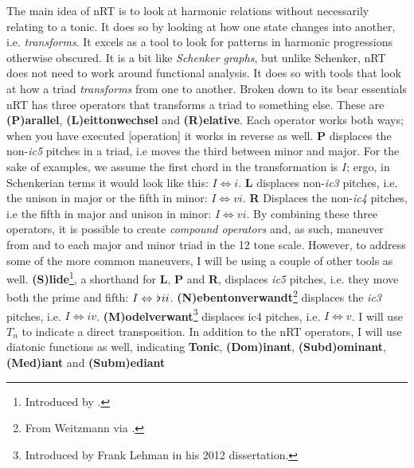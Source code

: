 The main idea of \ac{nRT} is to look at harmonic relations without necessarily relating to a tonic. It does so by looking at how one state changes into another, i.e. \textit{transforms}. It excels as a tool to look for patterns in harmonic progressions otherwise obscured. It is a bit like \textit{Schenker graphs}, but unlike Schenker, \ac{nRT} does not need to work around functional analysis. It does so with tools that look at how a triad \textit{transforms} from one to another. Broken down to its bear essentials \ac{nRT} has three operators that transforms a triad to something else. These are \textbf{(P)arallel}, \textbf{(L)eittonwechsel} and \textbf{(R)elative}. Each operator works both ways; when you have executed [operation] it works in reverse as well. 
\textbf{P} displaces the non-\textit{ic5} pitches in a triad, i.e moves the third between minor and major. For the sake of examples, we assume the first chord in the transformation is \(I\); ergo, in Schenkerian terms it would look like this: \({I}\Leftrightarrow{i}\). 
\textbf{L} displaces non-\textit{ic3} pitches, i.e. the unison in major or the fifth in minor: \({I}\Leftrightarrow{vi}\).
\textbf{R} Displaces the non-\textit{ic4} pitches, i.e the fifth in major and unison in minor: \({I}\Leftrightarrow{vi}\). 
By combining these three operators, it is possible to create \textit{compound operators} and, as such, maneuver from and to each major and minor triad in the 12 tone scale. However, to address some of the more common maneuvers, I will be using a couple of other tools as well. 
\textbf{(S)lide}\footnote{Introduced by \citealt{lewin_generalized_2007}.}, a shorthand for \textbf{L}, \textbf{P} and \textbf{R}, displaces \textit{ic5} pitches, i.e. they move both the prime and fifth: \({I}\Leftrightarrow{\hspace*{0.18ex}\flat\hspace*{0.18ex}}{ii}\). 
\textbf{(N)ebentonverwandt}\footnote{From Weitzmann via \citealt{lehman_reading_2012}.} displaces the \textit{ic3} pitches, i.e. \({I}\Leftrightarrow{iv}\).  
\textbf{(M)odelverwant}\footnote{Introduced by Frank Lehman in his 2012 dissertation.} displaces ic4 pitches, i.e. \({I}\Leftrightarrow{v}\). I will use \(T_{n}\) to indicate a direct transposition. In addition to the \ac{nRT} operators, I will use diatonic functions as well, indicating \textbf{Tonic}, \textbf{(Dom)inant}, \textbf{(Subd)ominant}, \textbf{(Med)iant} and \textbf{(Subm)ediant} 


